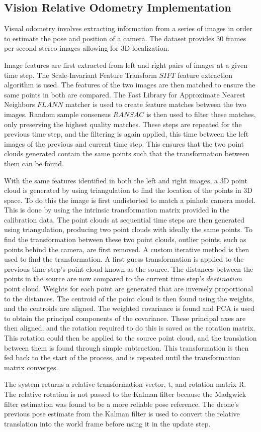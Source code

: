 \documentclass[bare_jrnl_transmag]{subfiles}
\begin{document}
\subsection{Vision Relative Odometry Implementation}

Visual odometry involves extracting information from a series of images in order to estimate the pose and position of a camera. The dataset provides 30 frames per second stereo images allowing for 3D localization. 

Image features are first extracted from left and right pairs of images at a given time step. The Scale-Invariant Feature Transform \(SIFT\) feature extraction algorithm is used. The features of the two images are then matched to ensure the same points in both are compared. The Fast Library for Approximate Nearest Neighbors \(FLANN\) matcher is used to create feature matches between the two images.  Random sample consensus \(RANSAC\) is then used to filter these matches, only preserving the highest quality matches.  These steps are repeated for the previous time step, and the filtering is again applied, this time between the left images of the previous and current time step. This ensures that the two point clouds generated contain the same points such that the transformation between them can be found.

With the same features identified in both the left and right images, a 3D point cloud is generated by using triangulation to find the location of the points in 3D space. To do this the image is first undistorted to match a pinhole camera model. This is done by using the intrinsic transformation matrix provided in the calibration data. The point clouds at sequential time steps are then generated using triangulation, producing two point clouds with ideally the same points. To find the transformation between these two point clouds, outlier points, such as points behind the camera, are first removed. A custom iterative method is then used to find the transformation. A first guess transformation is applied to the previous time step's point cloud known as the source. The distances between the points in the source are now compared to the current time step's \(destination\) point cloud. Weights for each point are generated that are inversely proportional to the distances. The centroid of the point cloud is then found using the weights, and the centroids are aligned. The weighted covariance is found and PCA is used to obtain the principal components of the covariance. These principal axes are then aligned, and the rotation required to do this is saved as the rotation matrix. This rotation could then be applied to the source point cloud, and the translation between them is found through simple subtraction. This transformation is then fed back to the start of the process, and is repeated until the transformation matrix converges.

The system returns a relative transformation vector, t, and rotation matrix R. The relative rotation is not passed to the Kalman filter because the Madgwick filter estimation was found to be a more reliable pose reference. The drone's previous pose estimate from the Kalman filter is used to convert the relative translation into the world frame before using it in the update step.
\end{document}
